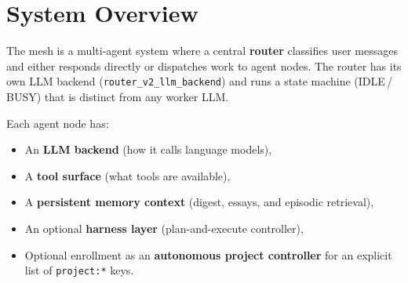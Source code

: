 \documentclass[11pt,letterpaper]{report}
\newcommand{\code}[1]{\texttt{#1}}
\begin{document}
\chapter{System Overview}
\label{ch:overview}

The mesh is a multi-agent system where a central \textbf{router}
classifies user messages and either responds directly or dispatches work
to agent nodes.  The router has its own LLM backend
(\code{router\_v2\_llm\_backend}) and runs a state machine
(IDLE\,/\,BUSY) that is distinct from any worker LLM.

Each agent node has:
\begin{itemize}[nosep]
  \item An \textbf{LLM backend} (how it calls language models),
  \item A \textbf{tool surface} (what tools are available),
  \item A \textbf{persistent memory context} (digest, essays, and episodic
        retrieval),
  \item An optional \textbf{harness layer} (plan-and-execute controller),
  \item Optional enrollment as an \textbf{autonomous project controller}
        for an explicit list of \code{project:*} keys.
\end{itemize}
\end{document}
